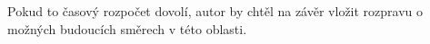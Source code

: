 Pokud to časový rozpočet dovolí, autor by chtěl na závěr vložit rozpravu o možných budoucích směrech v této oblasti.

